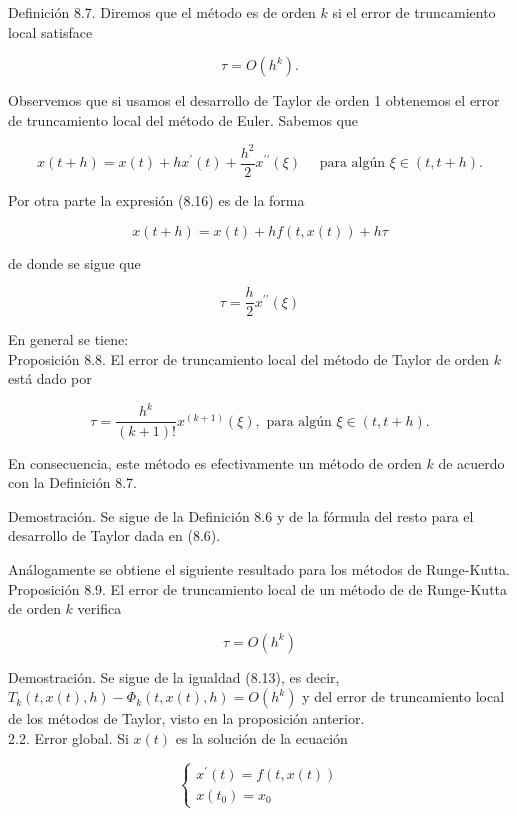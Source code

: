 \documentclass[10pt]{article}
\begin{document}
Definición 8.7. Diremos que el método es de orden $k$ si el error de truncamiento local satisface

$$
\tau=O\left(h^{k}\right) .
$$

Observemos que si usamos el desarrollo de Taylor de orden 1 obtenemos el error de truncamiento local del método de Euler. Sabemos que

$$
x(t+h)=x(t)+h x^{\prime}(t)+\frac{h^{2}}{2} x^{\prime \prime}(\xi) \quad \text { para algún } \xi \in(t, t+h) .
$$

Por otra parte la expresión (8.16) es de la forma

$$
x(t+h)=x(t)+h f(t, x(t))+h \tau
$$

de donde se sigue que


\begin{equation*}
\tau=\frac{h}{2} x^{\prime \prime}(\xi) \tag{8.17}
\end{equation*}


En general se tiene:\\
Proposición 8.8. El error de truncamiento local del método de Taylor de orden $k$ está dado por


\begin{equation*}
\tau=\frac{h^{k}}{(k+1)!} x^{(k+1)}(\xi), \text { para algún } \xi \in(t, t+h) . \tag{8.18}
\end{equation*}


En consecuencia, este método es efectivamente un método de orden $k$ de acuerdo con la Definición 8.7.

Demostración. Se sigue de la Definición 8.6 y de la fórmula del resto para el desarrollo de Taylor dada en (8.6).

Análogamente se obtiene el siguiente resultado para los métodos de Runge-Kutta.\\
Proposición 8.9. El error de truncamiento local de un método de de Runge-Kutta de orden $k$ verifica

$$
\tau=O\left(h^{k}\right)
$$

Demostración. Se sigue de la igualdad (8.13), es decir, $T_{k}(t, x(t), h)-\Phi_{k}(t, x(t), h)=O\left(h^{k}\right)$ y del error de truncamiento local de los métodos de Taylor, visto en la proposición anterior.\\
2.2. Error global. Si $x(t)$ es la solución de la ecuación

$$
\left\{\begin{array}{l}
x^{\prime}(t)=f(t, x(t)) \\
x\left(t_{0}\right)=x_{0}
\end{array}\right.
$$
\end{document}
